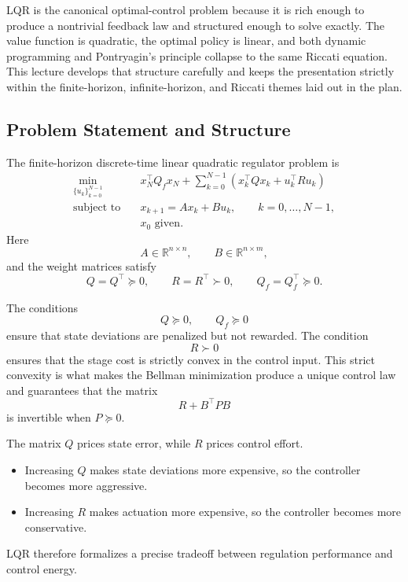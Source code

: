 \label{lec:l6}

\begin{intuition}
	LQR is the canonical optimal-control problem because it is rich enough to produce a nontrivial feedback law and structured enough to solve exactly. The value function is quadratic, the optimal policy is linear, and both dynamic programming and Pontryagin's principle collapse to the same Riccati equation. This lecture develops that structure carefully and keeps the presentation strictly within the finite-horizon, infinite-horizon, and Riccati themes laid out in the plan.
\end{intuition}

\subsection{Problem Statement and Structure}
\label{sec:l6-problem-statement-and-structure}

\begin{definition}\label{def:l6-finite-horizon-discrete-time-lqr}
	The finite-horizon discrete-time linear quadratic regulator problem is
	\begin{align*}
		\min_{\{u_k\}_{k=0}^{N-1}} \quad & x_N^\top Q_f x_N + \sum_{k=0}^{N-1}\left(x_k^\top Q x_k + u_k^\top R u_k\right) \\
		\text{subject to}\quad & x_{k+1}=Ax_k+Bu_k, \qquad k=0,\dots,N-1, \\
		                       & x_0 \text{ given}.
	\end{align*}
	Here
	\[
		A \in \mathbb{R}^{n \times n},
		\qquad
		B \in \mathbb{R}^{n \times m},
	\]
	and the weight matrices satisfy
	\[
		Q=Q^\top \succeq 0,
		\qquad
		R=R^\top \succ 0,
		\qquad
		Q_f=Q_f^\top \succeq 0.
	\]
\end{definition}

\begin{remark}
	The conditions
	\[
		Q \succeq 0,
		\qquad
		Q_f \succeq 0
	\]
	ensure that state deviations are penalized but not rewarded. The condition
	\[
		R \succ 0
	\]
	ensures that the stage cost is strictly convex in the control input. This strict convexity is what makes the Bellman minimization produce a unique control law and guarantees that the matrix
	\[
		R+B^\top P B
	\]
	is invertible when $P \succeq 0$.
\end{remark}

\begin{remark}
	The matrix $Q$ prices state error, while $R$ prices control effort.
	\begin{itemize}
		\item Increasing $Q$ makes state deviations more expensive, so the controller becomes more aggressive.
		\item Increasing $R$ makes actuation more expensive, so the controller becomes more conservative.
	\end{itemize}
	LQR therefore formalizes a precise tradeoff between regulation performance and control energy.
\end{remark}

